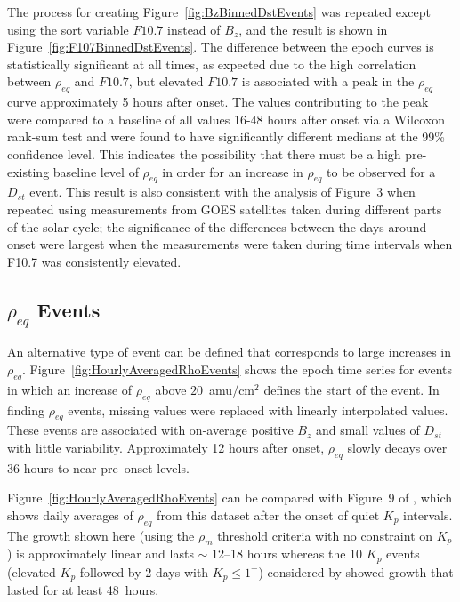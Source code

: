 \documentclass[12pt]{article}
\begin{document}

The process for creating Figure~\ref{fig:BzBinnedDstEvents} was repeated except using the sort variable $F10.7$ instead of $B_z$, and the result is shown in Figure~\ref{fig:F107BinnedDstEvents}. The difference between the epoch curves is statistically significant at all times, as expected due to the high correlation between $\rho_{eq}$ and $F10.7$, but elevated $F10.7$ is associated with a peak in the $\rho_{eq}$ curve approximately 5 hours after onset. The values contributing to the peak were compared to a baseline of all values 16-48 hours after onset via a Wilcoxon rank-sum test and were found to have significantly different medians at the 99\% confidence level.  This indicates the possibility that there must be a high pre-existing baseline level of $\rho_{eq}$ in order for an increase in $\rho_{eq}$ to be observed for a $D_{st}$ event.  This result is also consistent with the analysis of Figure~3 when repeated using measurements from GOES satellites taken during different parts of the solar cycle; the significance of the differences between the days around onset were largest when the measurements were taken during time intervals when F10.7 was consistently elevated.

\subsection{$\rho_{eq}$ Events}

An alternative type of event can be defined that corresponds to large increases in $\rho_{eq}$.  Figure~\ref{fig:HourlyAveragedRhoEvents} shows the epoch time series for events in which an increase of $\rho_{eq}$ above $20$~amu/cm$^2$ defines the start of the event. In finding $\rho_{eq}$ events, missing values were replaced with linearly interpolated values.  These events are associated with on-average positive $B_z$ and small values of $D_{st}$ with little variability.  Approximately 12 hours after onset, $\rho_{eq}$ slowly decays over 36 hours to near pre--onset levels.  

Figure~\ref{fig:HourlyAveragedRhoEvents} can be compared with Figure~9 of \cite{Denton2016}, which shows daily averages of $\rho_{eq}$ from this dataset after the onset of quiet $K_p$ intervals.  The growth shown here (using the $\rho_m$ threshold criteria with no constraint on $K_p$) is approximately linear and lasts $\sim$ 12--18 hours whereas the 10 $K_p$ events (elevated $K_p$ followed by 2 days with $K_p \le 1^+$) considered by \cite{Denton2016} showed growth that lasted for at least 48~hours. 
\end{document}
